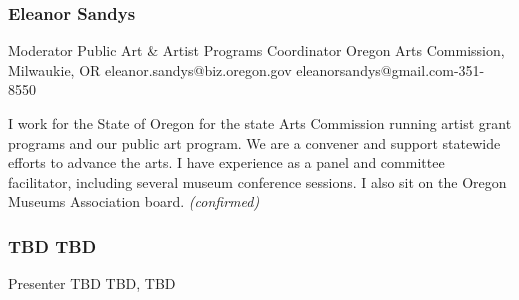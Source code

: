 \documentclass{report}
\begin{document}
              
                \subsubsection*{ Eleanor Sandys }
                Moderator\newline
                Public Art \& Artist Programs Coordinator\newline
                Oregon Arts Commission, Milwaukie, OR
                \newline
                eleanor.sandys@biz.oregon.gov\newline
                eleanorsandys@gmail.com-351-8550\newline

                I work for the State of Oregon for the state Arts Commission running artist grant programs and our public art program. We are a convener and support statewide efforts to advance the arts. I have experience as a panel and committee facilitator, including several museum conference sessions. I also sit on the Oregon Museums Association board.\newline
                \emph{ (confirmed) }
              

              
                \subsubsection*{ TBD TBD }
                Presenter\newline
                TBD\newline
                TBD, TBD
                \newline
                
                
                
\end{document}
